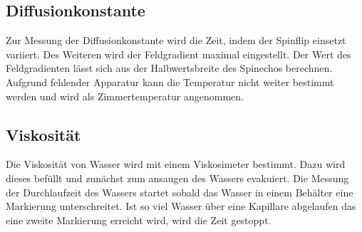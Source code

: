 \subsection{Diffusionkonstante}%
\label{sub:diffusionskonstante}
Zur Messung der Diffusionkonstante wird die Zeit, indem der Spinflip einsetzt
variiert. 
Des Weiteren wird der Feldgradient maximal eingestellt.
Der Wert des Feldgradienten lässt sich aus der Halbwertsbreite des Spinechos
berechnen.
Aufgrund fehlender Apparatur kann die Temperatur nicht weiter bestimmt werden
und wird als Zimmertemperatur angenommen. 

\subsection{Viskosität}
Die Viskosität von Wasser wird mit einem Viskosimeter bestimmt. Dazu wird
dieses befüllt und zunächst zum ansaugen des Wassers evakuiert.
Die Messung der Durchlaufzeit des Wassers startet sobald das Wasser in einem
Behälter eine Markierung unterschreitet. 
Ist so viel Wasser über eine Kapillare abgelaufen das eine zweite Markierung
erreicht wird, wird die Zeit gestoppt.
